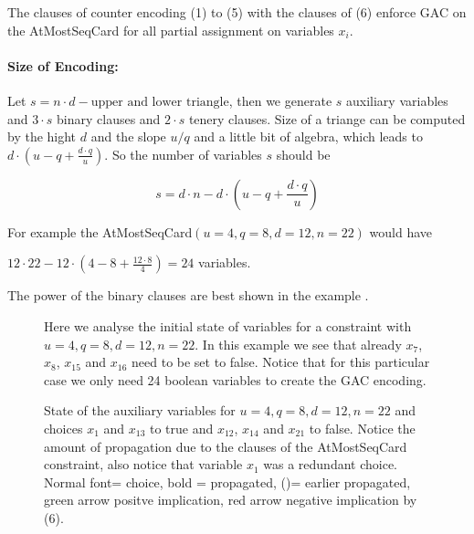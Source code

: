 \documentclass[]{llncs}
\begin{document}
\begin{theorem}
    The clauses of counter encoding (1) to (5) with the clauses of (6)
    enforce GAC on the AtMostSeqCard for all partial assignment on
    variables $x_{i}$. 
\end{theorem}


\paragraph{Size of Encoding: } Let $s = n\cdot d-\text{upper and lower
triangle}$, then we generate $s$ auxiliary variables and $3\cdot s$
binary clauses and $2\cdot s$ tenery clauses. Size of a triange can be
computed by the hight $d$ and the slope $u/q$ and a little bit of
algebra, which leads to $d\cdot(u-q+\frac{d \cdot q}{u}) $. So the
number of variables $s$ should be

$$ s = d \cdot n - d \cdot(u-q+\frac{d \cdot q}{u}) $$

For example the AtMostSeqCard$(u=4,q=8,d=12,n=22)$ would have 

$ 12\cdot 22- 12\cdot ( 4-8+\frac{12 \cdot 8}{4}) = 24$ variables. 


%

The power of the binary clauses are best shown in the example 
\cite{Siala12}.


\begin{figure}
\centering 
\caption{Here we analyse the initial state of variables for a constraint
    with $u=4,q=8,d=12,n=22$. In this example we see that already
    $x_{7}$, $x_{8}$, $x_{15}$ and $x_{16}$ need to be set to false.
    Notice that for this particular case we only need 24 boolean
    variables to create the GAC encoding.}
%
\end{figure}

\begin{figure}
\centering 
\caption{State of the auxiliary variables for $u=4,q=8,d=12,n=22$ and
    choices $x_{1}$ and $x_{13}$ to true and $x_{12}$, $x_{14}$ and
    $x_{21}$ to false. Notice the amount of propagation due to the
    clauses of the AtMostSeqCard constraint, also notice that variable
$x_{1}$ was a redundant choice. Normal font= choice, bold = propagated,
()= earlier propagated, green arrow positve implication, red arrow
negative implication by (6).}
%
\end{figure}
\end{document}
